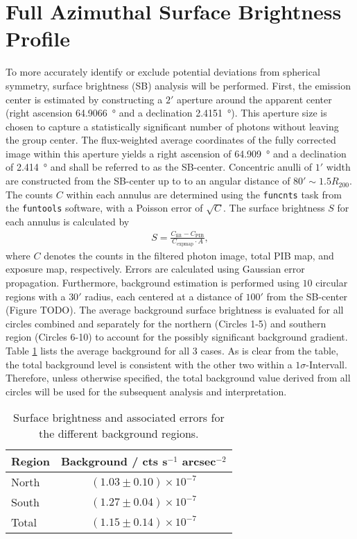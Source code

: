 \section{Full Azimuthal Surface Brightness Profile}\label{sec:full_az}
To more accurately identify or exclude potential deviations from spherical symmetry, surface brightness (SB) analysis will be performed. First, the emission center is estimated by constructing a \(2'\) aperture around the apparent center (right ascension \SI{64.9066}{\degree} and a declination \SI{2.4151}{\degree}). This aperture size is chosen to capture a statistically significant number of photons without leaving the group center. The flux-weighted average coordinates of the fully corrected image within this aperture yields a right ascension of \SI{64.909}{\degree} and a declination of \SI{2.414}{\degree} and shall be referred to as the SB-center. Concentric anulli of \(1'\) width are constructed from the SB-center up to to an angular distance of \(80' \sim 1.5R_{200}\). The counts \(C\) within each annulus are determined using the \texttt{funcnts} task from the \texttt{funtools} software, with a Poisson error of \(\sqrt{C}\). The surface brightness \(S\) for each annulus is calculated by
\begin{align*}
    S = \frac{C_\text{filt} - C_\text{PIB}}{C_\text{expmap}\cdot A},
\end{align*}
where \(C\) denotes the counts in the filtered photon image, total PIB map, and exposure map, respectively. Errors are calculated using Gaussian error propagation. Furthermore, background estimation is performed using \(10\) circular regions with a \(30'\) radius, each centered at a distance of \(100'\) from the SB-center (Figure TODO). The average background surface brightness is evaluated for all circles combined and separately for the northern (Circles 1-5) and southern region (Circles 6-10) to account for the possibly significant background gradient. Table \ref{tab:background} lists the average background for all 3 cases. As is clear from the table, the total background level is consistent with the other two within a \(1\sigma\)-Intervall. Therefore, unless otherwise specified, the total background value derived from all circles will be used for the subsequent analysis and interpretation.
%
\begin{table}[htbp]
    \centering
    \begin{tabular}{l c}
    \toprule
    Region & Background / cts s$^{-1}$ arcsec$^{-2}$ \\
    \midrule
    North & $(1.03 \pm 0.10) \times 10^{-7}$ \\
    South & $(1.27 \pm 0.04) \times 10^{-7}$ \\
    Total & $(1.15 \pm 0.14) \times 10^{-7}$ \\
    \bottomrule
    \end{tabular}
    \caption{Surface brightness and associated errors for the different background regions.}
    \label{tab:background}
\end{table}
